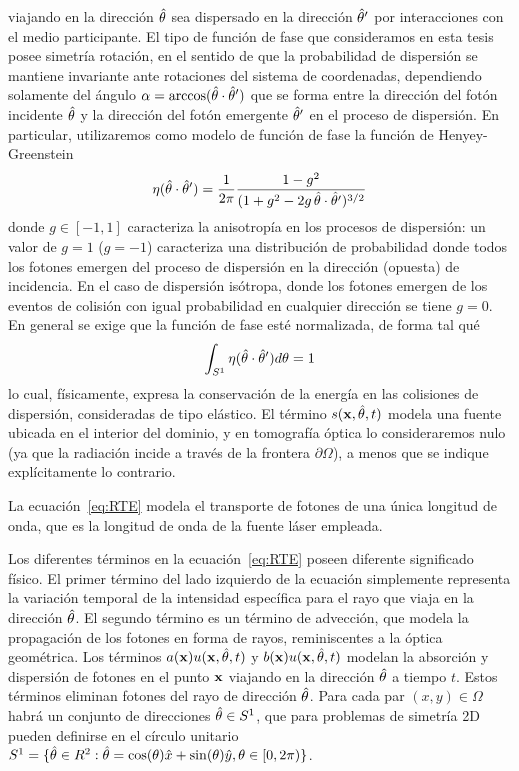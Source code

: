 viajando en la dirección $\hat{\theta}$ sea dispersado en la dirección $\hat{\theta}'$ 
por interacciones con el medio participante. El tipo de función 
de fase que consideramos en esta tesis posee simetría rotación, 
en el sentido de que la probabilidad de dispersión se mantiene invariante 
ante rotaciones del sistema de coordenadas, dependiendo solamente 
del ángulo $\alpha=\arccos(\hat{\theta} \cdot \hat{\theta}')$ que se forma entre la dirección 
del fotón incidente $\hat{\theta}$ y la dirección del fotón emergente $\hat{\theta}'$ 
en el proceso de dispersión. En particular, utilizaremos como modelo de función de fase la 
función de Henyey-Greenstein~\cite{Henyey1941}
\begin{equation}
\eta(\hat{\theta}\cdot\hat{\theta}')=\frac{1}{2\pi} 
\frac{1-g^2}{(1+g^2-2g \, \hat{\theta} \cdot \hat{\theta}')^{3/2}}
\label{eq:Henyey-Greeinstein}
\end{equation}
donde $g \in [-1,1]$ caracteriza la anisotropía en los procesos de dispersión: 
 un valor de $g=1$ ($g=-1$) caracteriza una distribución de probabilidad donde todos
los fotones emergen del proceso de dispersión en la dirección (opuesta) de 
incidencia. En el caso de dispersión isótropa, 
donde los fotones emergen de los eventos de colisión con igual probabilidad 
en cualquier dirección se tiene $ g = 0 $. En general se exige que la función de fase 
esté normalizada, de forma tal qué
\begin{equation}
\int_{S^1}\eta(\hat{\theta}\cdot\hat{\theta}') d\theta=1
\label{eq:Henyey-Greeinsteinnorm}
\end{equation}
lo cual, físicamente, expresa la conservación de la energía en las colisiones 
de dispersión, consideradas de tipo elástico. El término $ s(\mathbf{x},\hat{\theta},t)$ 
modela una fuente ubicada en el interior del dominio, y en tomografía óptica 
lo consideraremos nulo (ya que la radiación incide a través de la frontera $\partial \Omega$), 
a menos que se indique explícitamente lo contrario. 

La ecuación~\eqref{eq:RTE} 
modela el transporte de fotones de una única longitud de onda, que es la longitud 
de onda de la fuente láser empleada.

Los diferentes términos en la ecuación~\eqref{eq:RTE} poseen 
diferente significado físico. El primer término del lado izquierdo de la ecuación simplemente representa la variación temporal  
de la intensidad específica para el rayo que viaja en la dirección $\hat{\theta}$. 
El segundo término es un término de advección, que modela la propagación de 
los fotones en forma de rayos, reminiscentes a la óptica geométrica. Los términos $a(\mathbf{x})u(\mathbf{x},\hat{\theta},t)$ y $b(\mathbf{x})u(\mathbf{x},\hat{\theta},t)$ modelan la 
absorción y dispersión de fotones 
en el punto $\mathbf{x}$ viajando en la dirección $\hat{\theta}$ a tiempo $t$. Estos términos eliminan 
fotones del rayo de dirección $\hat{\theta}$. 
Para cada par $(x,y)\in \Omega$ habrá un conjunto de direcciones $\hat{\theta} \in S^1$, 
que para problemas de simetría 2D 
pueden definirse en el círculo unitario $S^1=\{ \hat{\theta} \in R^2: 
\hat{\theta}=\cos(\theta)\hat x+\sin(\theta) \hat y, \theta \in [0,2\pi)  \}$. 

